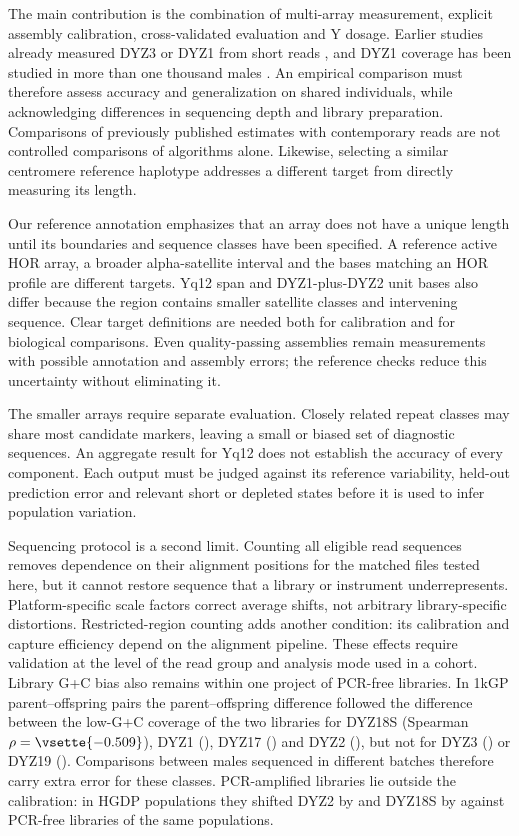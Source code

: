The main contribution is the combination of multi-array measurement, explicit assembly calibration, cross-validated evaluation and Y dosage. Earlier studies already measured DYZ3 or DYZ1 from short reads \cite{Miga2014,Altemose2014}, and DYZ1 coverage has been studied in more than one thousand males \cite{SanRoman2024}. An empirical comparison must therefore assess accuracy and generalization on shared individuals, while acknowledging differences in sequencing depth and library preparation. Comparisons of previously published estimates with contemporary reads are not controlled comparisons of algorithms alone. Likewise, selecting a similar centromere reference haplotype \cite{Shiraishi2026} addresses a different target from directly measuring its length.

Our reference annotation emphasizes that an array does not have a unique length until its boundaries and sequence classes have been specified. A reference active HOR array, a broader alpha-satellite interval and the bases matching an HOR profile are different targets. Yq12 span and DYZ1-plus-DYZ2 unit bases also differ because the region contains smaller satellite classes and intervening sequence. Clear target definitions are needed both for calibration and for biological comparisons. Even quality-passing assemblies remain measurements with possible annotation and assembly errors; the reference checks reduce this uncertainty without eliminating it.

The smaller arrays require separate evaluation. Closely related repeat classes may share most candidate markers, leaving a small or biased set of diagnostic sequences. An aggregate result for Yq12 does not establish the accuracy of every component. Each output must be judged against its reference variability, held-out prediction error and relevant short or depleted states before it is used to infer population variation.

Sequencing protocol is a second limit. Counting all eligible read sequences removes dependence on their alignment positions for the matched files tested here, but it cannot restore sequence that a library or instrument underrepresents. Platform-specific scale factors correct average shifts, not arbitrary library-specific distortions. Restricted-region counting adds another condition: its calibration and capture efficiency depend on the alignment pipeline. These effects require validation at the level of the read group and analysis mode used in a cohort. Library G+C bias also remains within one project of PCR-free libraries. In  1kGP parent--offspring pairs the parent--offspring difference followed the difference between the low-G+C coverage of the two libraries for DYZ18S (Spearman $\rho=\vsette{-0.509}$), DYZ1 (), DYZ17 () and DYZ2 (), but not for DYZ3 () or DYZ19 (). Comparisons between males sequenced in different batches therefore carry extra error for these  classes. PCR-amplified libraries lie outside the calibration: in HGDP populations they shifted DYZ2 by  and DYZ18S by  against PCR-free libraries of the same populations.

